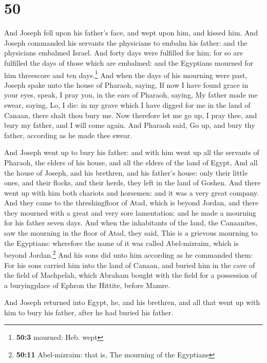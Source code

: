 \hypertarget{section-49}{%
\section{50}\label{section-49}}

 And Joseph fell upon his father's face, and wept upon
him, and kissed him.  And Joseph commanded his servants
the physicians to embalm his father: and the physicians embalmed Israel.
 And forty days were fulfilled for him; for so are
fulfilled the days of those which are embalmed: and the Egyptians
mourned for him threescore and ten days.\footnote{\textbf{50:3} mourned:
  Heb. wept}  And when the days of his mourning were past,
Joseph spake unto the house of Pharaoh, saying, If now I have found
grace in your eyes, speak, I pray you, in the ears of Pharaoh, saying,
 My father made me swear, saying, Lo, I die: in my grave
which I have digged for me in the land of Canaan, there shalt thou bury
me. Now therefore let me go up, I pray thee, and bury my father, and I
will come again.  And Pharaoh said, Go up, and bury thy
father, according as he made thee swear.

 And Joseph went up to bury his father: and with him went
up all the servants of Pharaoh, the elders of his house, and all the
elders of the land of Egypt,  And all the house of Joseph,
and his brethren, and his father's house: only their little ones, and
their flocks, and their herds, they left in the land of Goshen.
 And there went up with him both chariots and horsemen:
and it was a very great company.  And they came to the
threshingfloor of Atad, which is beyond Jordan, and there they mourned
with a great and very sore lamentation: and he made a mourning for his
father seven days.  And when the inhabitants of the land,
the Canaanites, saw the mourning in the floor of Atad, they said, This
is a grievous mourning to the Egyptians: wherefore the name of it was
called Abel-mizraim, which is beyond Jordan.\footnote{\textbf{50:11}
  Abel-mizraim: that is, The mourning of the Egyptians} 
And his sons did unto him according as he commanded them:
 For his sons carried him into the land of Canaan, and
buried him in the cave of the field of Machpelah, which Abraham bought
with the field for a possession of a buryingplace of Ephron the Hittite,
before Mamre.

 And Joseph returned into Egypt, he, and his brethren,
and all that went up with him to bury his father, after he had buried
his father.

